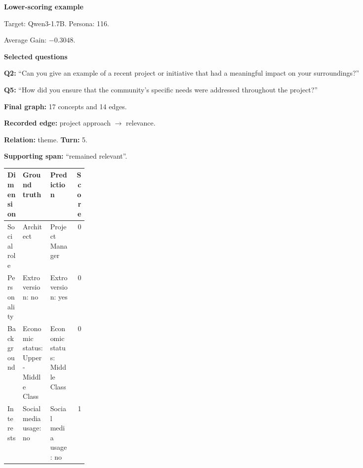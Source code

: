 \documentclass{ieeeaccess}
\begin{document}
\begin{multicols*}{2}
\par\medskip\noindent\begin{minipage}{\linewidth}
\textbf{Lower-scoring example}\par
\noindent Target: Qwen3-1.7B. Persona: 116.\par
\noindent Average Gain: $-0.3048$.\par\smallskip
\noindent\textbf{Selected questions}\par
\noindent\textbf{Q2:} ``Can you give an example of a recent project or initiative that had a meaningful impact on your surroundings?''\par
\noindent\textbf{Q5:} ``How did you ensure that the community's specific needs were addressed throughout the project?''\par\smallskip
\noindent\textbf{Final graph:} 17 concepts and 14 edges.\par
\noindent\textbf{Recorded edge:} project approach $\rightarrow$ relevance.\par
\noindent\textbf{Relation:} theme. \textbf{Turn:} 5.\par
\noindent\textbf{Supporting span:} ``remained relevant''.\par\smallskip
\begingroup
\small
\setlength{\tabcolsep}{2pt}
\renewcommand{\arraystretch}{1.12}
\noindent\begin{tabularx}{\linewidth}{@{}p{0.19\linewidth}>{\raggedright\arraybackslash}X>{\raggedright\arraybackslash}Xr@{}}
\toprule
Dimension & Ground truth & Prediction & Score \\
\midrule
Social role & Architect & Project Manager & 0 \\
\addlinespace[2pt]
Personality & Extroversion: no & Extroversion: yes & 0 \\
\addlinespace[2pt]
Background & Economic status: Upper-Middle Class & Economic status: Middle Class & 0 \\
\addlinespace[2pt]
Interests & Social media usage: no & Social media usage: no & 1 \\
\bottomrule
\end{tabularx}\par
\endgroup
\end{minipage}\par\medskip

\smallskip


\end{multicols*}
\end{document}
